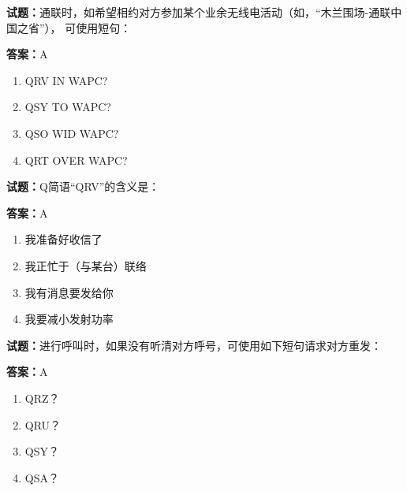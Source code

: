 \documentclass{ctexbook}
\begin{document}




\vspace{1em}

\textbf{试题：}通联时，如希望相约对方参加某个业余无线电活动（如，“木兰围场-通联中国之省”），
可使用短句： 

\textbf{答案：}A 

\begin{enumerate}[leftmargin=3em]
  \item QRV IN WAPC? 

  \item QSY TO WAPC? 

  \item QSO WID WAPC? 


  \item QRT OVER WAPC? 

\end{enumerate}





\vspace{1em}

\textbf{试题：}Q简语“QRV”的含义是： 

\textbf{答案：}A 

\begin{enumerate}[leftmargin=3em]
  \item 我准备好收信了 

  \item 我正忙于（与某台）联络 

  \item 我有消息要发给你 

  \item 我要减小发射功率 

\end{enumerate}





\vspace{1em}

\textbf{试题：}进行呼叫时，如果没有听清对方呼号，可使用如下短句请求对方重发： 

\textbf{答案：}A 

\begin{enumerate}[leftmargin=3em]
  \item QRZ？ 

  \item QRU？ 

  \item QSY？ 

  \item QSA？ 

\end{enumerate}
\end{document}
